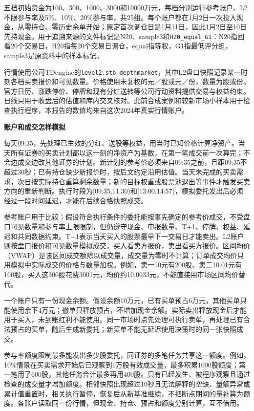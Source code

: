 \documentclass[UTF8,fontset=fandol,11pt,a4paper]{ctexart}
\newcommand{\lead}[1]{\par\medskip\Needspace{3\baselineskip}\noindent\textbf{#1}\par\smallskip}
\begin{document}
五档初始资金为100、300、1000、3000和10000万元，每档分别运行参考账户、L2不限参与率及5\%、10\%、20\%参与率，共25组。每个账户都在1月2日一次投入现金，从零持仓、零历史余单开始；原定首次调仓日是1月11日，因此1月2日至10日先持现金。用于追溯来源的文件标记是N20、sample3和\texttt{H20\_equal\_G1}：N20指回看20个交易日，H20指每20个交易日调仓，equal指等权，G1指最低评分组，sample3是原资料中的样本标记。

行情使用公司TDengine的\texttt{level2.stb\_depthmarket}，其中L2盘口快照记录某一时刻各档买卖报价和可见数量。价格使用未复权的元／股或元／份，数量为股或份。官方日历、涨跌停价、停牌和现有分红送转等公司行动资料提供交易与权益约束。日线只用于收盘后的估值和库内交叉核对。此前合成案例和较新市场小样本用于检查执行程序，本报告的数值均来自这次2024年真实行情账户。

\lead{账户和成交怎样模拟}
每天09:35，先处理已生效的分红、送股等权益，用当时已知价格计算净资产。当天所有证券的买卖计划都以这一刻的净资产为基数，在第一笔成交前一次算完；不会边成交边改其他证券的计划。新计划的参考价必须来自09:35之前，且距09:35不超过30秒；已有持仓缺少新报价时，按后文约定沿用估值。当天未完成的买卖需求，次日按实际持仓重算剩余数量；新的目标权重或股票池退出等事件才触发买卖方向的重新判断。执行时段为[09:35,11:30)和[13:00,14:57)，模拟委托发出后必须经过一段时间延迟，才能在后续合格快照成交。

参考账户用于比较：假设符合执行条件的委托能按事先确定的参考价成交，不受盘口可见数量和参与率上限限制，但仍遵守现金、申报数量、T+1、停牌、权益、延迟和共同数据约束。T+1表示当天买入的股票最早下一交易日才能卖出。L2账户则按盘口报价和可见数量模拟成交，买入看卖方报价，卖出看买方报价。区间均价（VWAP）是该区间成交额除以成交量，成交量为零时不计算；订单成交均价只用模拟中实际成交的价格与数量加权。例如，卖一10元有200股、卖二10.01元有100股，买入这300股花费3001元，均价约10.0033元，不能直接用市场区间均价替代。

一个账户只有一份现金余额。假设余额10万元，已有买单预占6万元，其他买单只能使用余下4万元；撤单只释放预占，不增加现金余额。实际卖出释放现金后才能用于买入，未到账红利不能使用。同一市场时点先处理可执行卖单，再处理已有合法预占的买单，随后生成新委托；新买单不能无延迟使用决策时的同一张快照成交。

参与率额度限制最多能发出多少股委托，同证券的多笔任务共享这一额度。例如，10\%情景在买卖需求开始后已观察到1万股有效成交量，最多积累1000股额度；第一笔用了600股，其他任务合计最多再用400股。只有已经发生、被程序观察且通过检查的成交量才增加额度。相邻快照出现超过10秒且无法解释的空缺、量额异常或累计值重置时，相关执行暂停，恢复后从新基准继续，不把断点期间的量补算为额度。各账户读取同一份行情，但现金、持仓、预占和额度分别计算，互不借用。
\end{document}
